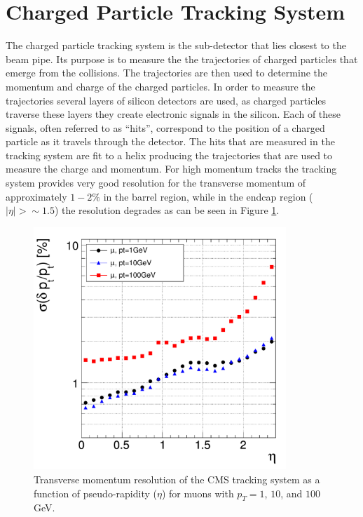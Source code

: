 \section{Charged Particle Tracking System}
\label{sec:tracker}
The charged particle tracking system is the sub-detector that lies closest to the beam pipe.
Its purpose is to measure the the trajectories of charged particles that emerge from the collisions.
The trajectories are then used to determine the momentum and charge of the charged particles.
In order to measure the trajectories several layers of silicon detectors are used, as charged particles traverse these layers they create electronic signals in the silicon.
Each of these signals, often referred to as ``hits'', correspond to the position of a charged particle as it travels through the detector.
The hits that are measured in the tracking system are fit to a helix producing the trajectories that are used to measure the charge and momentum.
For high momentum tracks the tracking system provides very good resolution for the transverse momentum of approximately $1-2\%$ in the barrel region, while in the endcap region ($|\eta| > \sim1.5$) the resolution degrades as can be seen in Figure \ref{fig:trackerptres}.
\begin{figure}[htpb]
\begin{center}
\includegraphics[width=0.85\textwidth]{plots/trackerptres.pdf}
\caption{Transverse momentum resolution of the CMS tracking system as a function of pseudo-rapidity ($\eta$) for muons with $p_{T} = 1$, $10$, and $100$ GeV\cite{CMS_DETECTOR}.}
\label{fig:trackerptres}
\end{center}
\end{figure}

